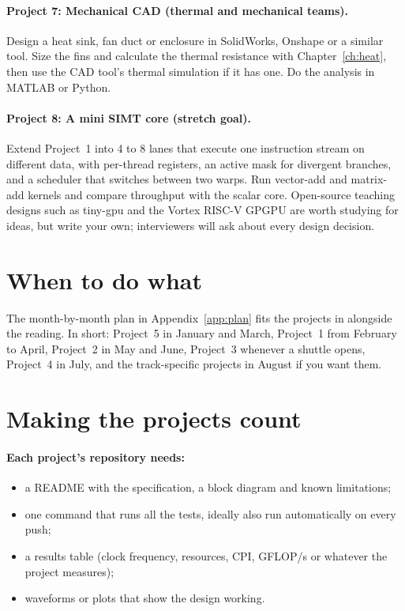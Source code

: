 \paragraph{Project 7: Mechanical CAD (thermal and mechanical teams).} Design a heat sink, fan duct or enclosure in SolidWorks, Onshape or a similar tool. Size the fins and calculate the thermal resistance with Chapter~\ref{ch:heat}, then use the CAD tool's thermal simulation if it has one. Do the analysis in MATLAB or Python.

\paragraph{Project 8: A mini SIMT core (stretch goal).} Extend Project~1 into 4 to 8 lanes that execute one instruction stream on different data, with per-thread registers, an active mask for divergent branches, and a scheduler that switches between two warps. Run vector-add and matrix-add kernels and compare throughput with the scalar core. Open-source teaching designs such as tiny-gpu and the Vortex RISC-V GPGPU are worth studying for ideas, but write your own; interviewers will ask about every design decision.

\section{When to do what}

The month-by-month plan in Appendix~\ref{app:plan} fits the projects in alongside the reading. In short: Project~5 in January and March, Project~1 from February to April, Project~2 in May and June, Project~3 whenever a shuttle opens, Project~4 in July, and the track-specific projects in August if you want them.

\section{Making the projects count}

\paragraph{Each project's repository needs:}
\begin{itemize}
  \item[$\square$] a README with the specification, a block diagram and known limitations;
  \item[$\square$] one command that runs all the tests, ideally also run automatically on every push;
  \item[$\square$] a results table (clock frequency, resources, CPI, GFLOP/s or whatever the project measures);
  \item[$\square$] waveforms or plots that show the design working.
\end{itemize}

